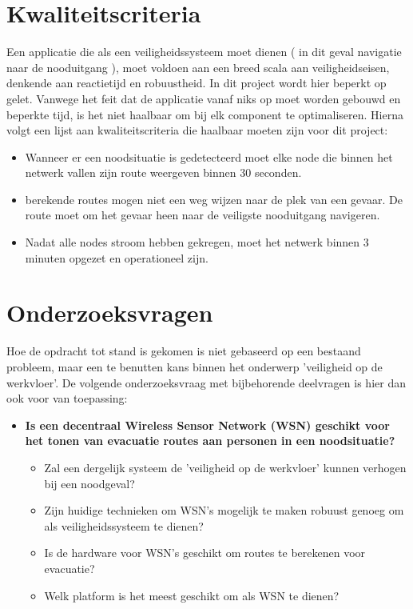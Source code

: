 \documentclass{../local}
\begin{document}
\section{Kwaliteitscriteria}
Een applicatie die als een veiligheidssysteem moet dienen ( in dit geval navigatie naar de nooduitgang ), moet voldoen aan een breed scala aan veiligheidseisen, denkende aan reactietijd en robuustheid. In dit project wordt hier beperkt op gelet. Vanwege het feit dat de applicatie vanaf niks op moet worden gebouwd en beperkte tijd, is het niet haalbaar om bij elk component te optimaliseren. Hierna volgt een lijst aan kwaliteitscriteria die haalbaar moeten zijn voor dit project:

\begin{itemize}
\item Wanneer er een noodsituatie is gedetecteerd moet elke node die binnen het netwerk vallen zijn route  weergeven binnen 30 seconden.
\item berekende routes mogen niet een weg wijzen naar de plek van een gevaar. De route moet om het gevaar heen naar de veiligste nooduitgang navigeren.
\item Nadat alle nodes stroom hebben gekregen, moet het netwerk binnen 3 minuten opgezet en operationeel zijn.
\end{itemize}

\section{Onderzoeksvragen}
Hoe de opdracht tot stand is gekomen is niet gebaseerd op een bestaand probleem, maar een te benutten kans binnen het onderwerp 'veiligheid op de werkvloer'. De volgende onderzoeksvraag met bijbehorende deelvragen is hier dan ook voor van toepassing:

\begin{itemize}
\item \textbf{Is een decentraal Wireless Sensor Network (WSN) geschikt voor het tonen van evacuatie routes aan personen in een noodsituatie?} 
\begin{itemize}
\item Zal een dergelijk systeem de 'veiligheid op de werkvloer' kunnen verhogen bij een noodgeval?
\item Zijn huidige technieken om WSN's mogelijk te maken robuust genoeg om als veiligheidssysteem te dienen?
\item Is de hardware voor WSN's geschikt om routes te berekenen voor evacuatie?
\item Welk platform is het meest geschikt om als WSN te dienen?
\end{itemize}
\end{itemize}
\end{document}
